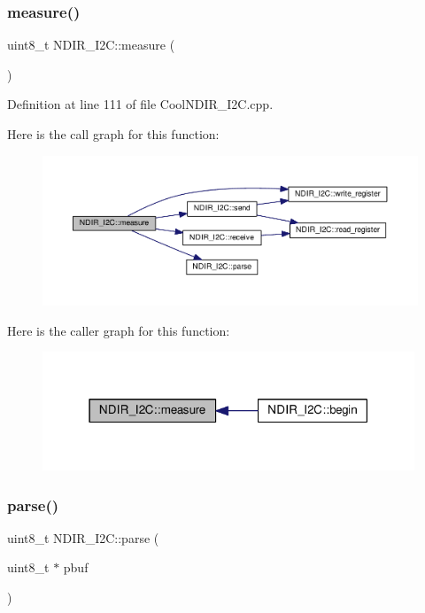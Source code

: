 \subsubsection{\texorpdfstring{measure()}{measure()}}
{\footnotesize\ttfamily uint8\+\_\+t N\+D\+I\+R\+\_\+\+I2\+C\+::measure (\begin{DoxyParamCaption}{ }\end{DoxyParamCaption})}



Definition at line 111 of file Cool\+N\+D\+I\+R\+\_\+\+I2\+C.\+cpp.

Here is the call graph for this function\+:\nopagebreak
\begin{figure}[H]
\begin{center}
\leavevmode
\includegraphics[width=350pt]{class_n_d_i_r___i2_c_ab8f50d38501d498b802b822bd4844ede_cgraph}
\end{center}
\end{figure}
Here is the caller graph for this function\+:\nopagebreak
\begin{figure}[H]
\begin{center}
\leavevmode
\includegraphics[width=315pt]{class_n_d_i_r___i2_c_ab8f50d38501d498b802b822bd4844ede_icgraph}
\end{center}
\end{figure}
\mbox{\label{class_n_d_i_r___i2_c_a907b756fc9244c7398b7d187b73cde94}} 
\subsubsection{\texorpdfstring{parse()}{parse()}}
{\footnotesize\ttfamily uint8\+\_\+t N\+D\+I\+R\+\_\+\+I2\+C\+::parse (\begin{DoxyParamCaption}\item[{uint8\+\_\+t $\ast$}]{pbuf }\end{DoxyParamCaption})\hspace{0.3cm}{\ttfamily [private]}}



